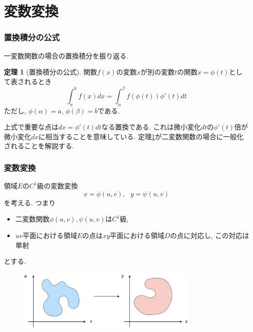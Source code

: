 \documentclass[dvipdfmx,cjk,10.2pt]{beamer}
\theoremstyle{definition}
\newtheorem{Thm}{定理}[section]
\begin{document}



\section{変数変換}

\begin{frame}
\frametitle{置換積分の公式}

一変数関数の場合の置換積分を振り返る.

\begin{Thm}[置換積分の公式] \label{置換積分の公式}
関数$f(x)$の変数$x$が別の変数$t$の関数$x=\phi(t)$として表されるとき
$$
\int_a^b f(x)dx =\int_\alpha^\beta f(\phi(t))\phi'(t)dt
$$
ただし, $\phi(\alpha)=a$,  $\phi(\beta)=b$である. 
\end{Thm}
上式で重要な点は$dx=\phi'(t)dt$なる置換である. 
これは微小変化$dt$の$\phi'(t)$倍が微小変化$dx$に相当することを意味している. 
定理\ref{置換積分の公式}が二変数関数の場合に一般化されることを解説する. 

\end{frame}






\begin{frame}
\frametitle{変数変換}

領域$E$の$C^1$級の変数変換
$$
x=\phi(u,v), \ \ \ y=\psi(u,v)
$$
を考える. 
つまり
\begin{itemize}
\item 二変数関数$\phi(u,v), \psi(u,v)$は$C^1$級, 
\item $uv$平面における領域$E$の点は$xy$平面における領域$D$の点に対応し, この対応は単射
\end{itemize}
とする. 

\vspace{-2mm}
\begin{figure}[htbp]
 \begin{center} 
  \includegraphics[width=90mm]{var_change0.png}
 \end{center}
\end{figure}
\vspace{-2mm}


\end{frame}
\end{document}
